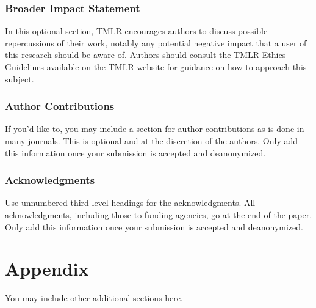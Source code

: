 \documentclass[10pt]{article} %
\begin{document}
\subsubsection*{Broader Impact Statement}
In this optional section, TMLR encourages authors to discuss possible repercussions of their work,
notably any potential negative impact that a user of this research should be aware of. 
Authors should consult the TMLR Ethics Guidelines available on the TMLR website
for guidance on how to approach this subject.

\subsubsection*{Author Contributions}
If you'd like to, you may include a section for author contributions as is done
in many journals. This is optional and at the discretion of the authors. Only add
this information once your submission is accepted and deanonymized. 

\subsubsection*{Acknowledgments}
Use unnumbered third level headings for the acknowledgments. All
acknowledgments, including those to funding agencies, go at the end of the paper.
Only add this information once your submission is accepted and deanonymized. 




\appendix
\section{Appendix}
You may include other additional sections here.
\end{document}
